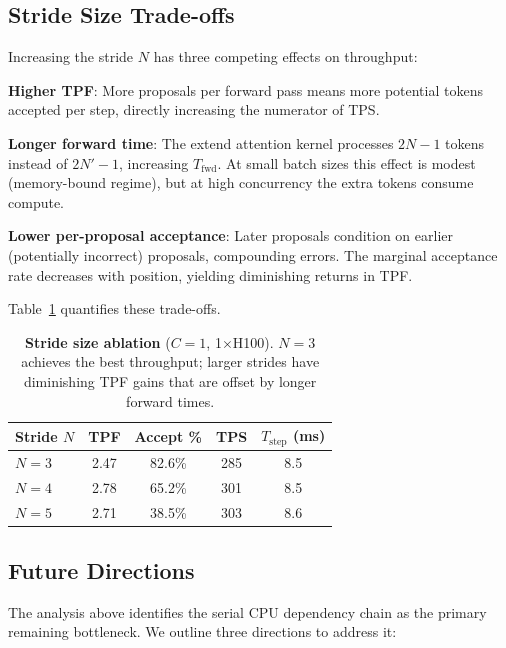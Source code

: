 \subsection{Stride Size Trade-offs}
\label{sec:stride_tradeoff}

Increasing the stride $N$ has three competing effects on throughput:

\begin{denseitemize}
\item \textbf{Higher TPF}: More proposals per forward pass means more potential tokens accepted per step, directly increasing the numerator of TPS.
\item \textbf{Longer forward time}: The extend attention kernel processes $2N{-}1$ tokens instead of $2N'{-}1$, increasing $T_{\text{fwd}}$. At small batch sizes this effect is modest (memory-bound regime), but at high concurrency the extra tokens consume compute.
\item \textbf{Lower per-proposal acceptance}: Later proposals condition on earlier (potentially incorrect) proposals, compounding errors. The marginal acceptance rate decreases with position, yielding diminishing returns in TPF.
\end{denseitemize}

Table~\ref{tab:stride_ablation} quantifies these trade-offs.

\begin{table}[t]
\centering
\caption{\textbf{Stride size ablation} ($C{=}1$, 1$\times$H100). $N{=}3$ achieves the best throughput; larger strides have diminishing TPF gains that are offset by longer forward times.}
\label{tab:stride_ablation}
\small
\begin{tabular}{lcccc}
\toprule
\textbf{Stride $N$} & \textbf{TPF} & \textbf{Accept \%} & \textbf{TPS} & $T_{\text{step}}$ \textbf{(ms)} \\
\midrule
$N{=}3$ & 2.47 & 82.6\% & 285 & 8.5 \\
$N{=}4$ & 2.78 & 65.2\% & 301 & 8.5 \\
$N{=}5$ & 2.71 & 38.5\% & 303 & 8.6 \\
\bottomrule
\end{tabular}
\end{table}

\subsection{Future Directions}
\label{sec:future}

The analysis above identifies the serial CPU dependency chain as the primary remaining bottleneck. We outline three directions to address it:

